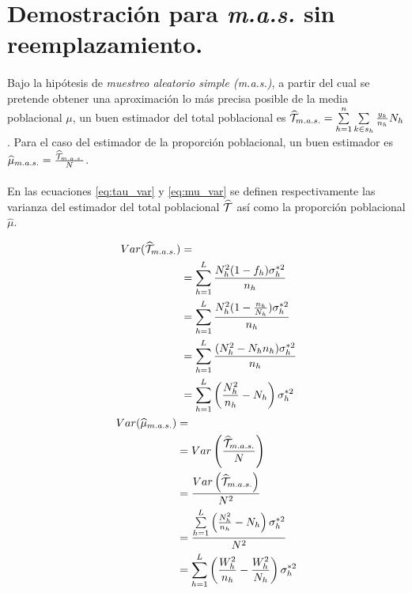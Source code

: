 \documentclass{article}
\begin{document}
  \section{Demostración para \emph{m.a.s.} sin reemplazamiento.}

    \paragraph{}
    Bajo la hipótesis de \emph{muestreo aleatorio simple (m.a.s.)}, a partir del cual se pretende obtener una aproximación lo más precisa posible de la media poblacional $\mu$, un buen estimador del total poblacional es $\widehat{\mathcal{T}}_{m.a.s.} = \sum\limits_{h=1}^n\sum\limits_{k \in s_h} \frac{y_k}{n_h}N_h$. Para el caso del estimador de la proporción poblacional, un buen estimador es $\widehat{\mu}_{m.a.s.} = \frac{\widehat{\mathcal{T}}_{m.a.s.}}{N}$.

    \paragraph{}
    En las ecuaciones \eqref{eq:tau_var} y \eqref{eq:mu_var} se definen respectivamente las varianza del estimador del total poblacional $\widehat{\mathcal{T}}$ así como la proporción poblacional $\widehat{\mu}$.

    \begin{align}
      \label{eq:tau_var}
      \begin{split}
        Var(\widehat{\mathcal{T}}_{m.a.s.}) &= \\
        &= \sum\limits_{h=1}^L\frac{N_h^2 (1-f_h)\sigma_h^{*2}}{n_h} \\
        &= \sum\limits_{h=1}^L\frac{N_h^2 (1-\frac{n_h}{N_h})\sigma_h^{*2}}{n_h} \\
        &= \sum\limits_{h=1}^L\frac{(N_h^2- N_hn_h)\sigma_h^{*2}}{n_h} \\
        &= \sum\limits_{h=1}^L\left(\frac{N_h^2}{n_h}- N_h\right)\sigma_h^{*2}
      \end{split} \\
    \label{eq:mu_var}
      \begin{split}
        Var(\widehat{\mu}_{m.a.s.}) &=\\
        &= Var\left(\frac{\widehat{\mathcal{T}}_{m.a.s.}}{N}\right) \\
        &= \frac{Var\left(\widehat{\mathcal{T}}_{m.a.s.}\right)}{N^2} \\
        &= \frac{\sum\limits_{h=1}^L\left(\frac{N_h^2}{n_h}- N_h\right)\sigma_h^{*2}}{N^2} \\
        &= \sum\limits_{h=1}^L\left(\frac{W_h^2}{n_h}- \frac{W_h^2}{N_h}\right)\sigma_h^{*2}
      \end{split}
    \end{align}
\end{document}
